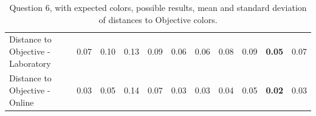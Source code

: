 \begin{table}[H]
{\begin{tabular}{lccccccccccccc}
    \multicolumn{4}{l}{Distance to Objective - Laboratory}                                                                                           & \multicolumn{1}{|c}{0.07}       & \multicolumn{1}{c|}{0.10}    & \multicolumn{1}{|c}{0.13}       & \multicolumn{1}{c|}{0.09}    & \multicolumn{1}{|c}{0.06}       & \multicolumn{1}{c|}{0.06}    & \multicolumn{1}{|c}{0.08}       & \multicolumn{1}{c|}{0.09}    & \multicolumn{1}{|c}{\textbf{0.05}}       & \multicolumn{1}{c|}{0.07}    \\
    \multicolumn{4}{l}{Distance to Objective - Online}                                                                                               & \multicolumn{1}{|c}{0.03}        & \multicolumn{1}{c|}{0.05}    & \multicolumn{1}{|c}{0.14}        & \multicolumn{1}{c|}{0.07}    & \multicolumn{1}{|c}{0.03}       & \multicolumn{1}{c|}{0.03}    & \multicolumn{1}{|c}{0.04}        & \multicolumn{1}{c|}{0.05}    & \multicolumn{1}{|c}{\textbf{0.02}}       & \multicolumn{1}{c|}{0.03}    \\ \hline
    \end{tabular}}
  \caption[Question 6, with expected Results.]{Question 6, with expected colors, possible results, mean and standard deviation of distances to Objective colors.}
  \label{table:lab_q6_expected}
\end{table}
%
